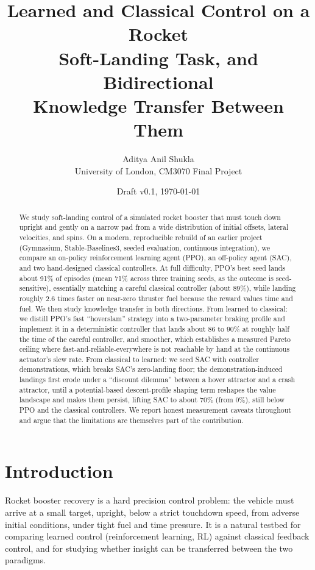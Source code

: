 \documentclass[10pt,twocolumn]{article}
\title{\textbf{Learned and Classical Control on a Rocket\\ Soft-Landing Task, and Bidirectional\\ Knowledge Transfer Between Them}}
\author{Aditya Anil Shukla\\ \small University of London, CM3070 Final Project}
\date{Draft v0.1, \today}
\begin{document}
\maketitle

\begin{abstract}
We study soft-landing control of a simulated rocket booster that must touch down upright and gently on a narrow pad from a wide distribution of initial offsets, lateral velocities, and spins. On a modern, reproducible rebuild of an earlier project (Gymnasium, Stable-Baselines3, seeded evaluation, continuous integration), we compare an on-policy reinforcement learning agent (PPO), an off-policy agent (SAC), and two hand-designed classical controllers. At full difficulty, PPO's best seed lands about 91\% of episodes (mean 71\% across three training seeds, as the outcome is seed-sensitive), essentially matching a careful classical controller (about 89\%), while landing roughly 2.6 times faster on near-zero thruster fuel because the reward values time and fuel. We then study knowledge transfer in both directions. From learned to classical: we distill PPO's fast ``hoverslam'' strategy into a two-parameter braking profile and implement it in a deterministic controller that lands about 86 to 90\% at roughly half the time of the careful controller, and smoother, which establishes a measured Pareto ceiling where fast-and-reliable-everywhere is not reachable by hand at the continuous actuator's slew rate. From classical to learned: we seed SAC with controller demonstrations, which breaks SAC's zero-landing floor; the demonstration-induced landings first erode under a ``discount dilemma'' between a hover attractor and a crash attractor, until a potential-based descent-profile shaping term reshapes the value landscape and makes them persist, lifting SAC to about 70\% (from 0\%), still below PPO and the classical controllers. We report honest measurement caveats throughout and argue that the limitations are themselves part of the contribution.
\end{abstract}

\section{Introduction}

Rocket booster recovery is a hard precision control problem: the vehicle must arrive at a small target, upright, below a strict touchdown speed, from adverse initial conditions, under tight fuel and time pressure. It is a natural testbed for comparing learned control (reinforcement learning, RL) against classical feedback control, and for studying whether insight can be transferred between the two paradigms.
\end{document}
